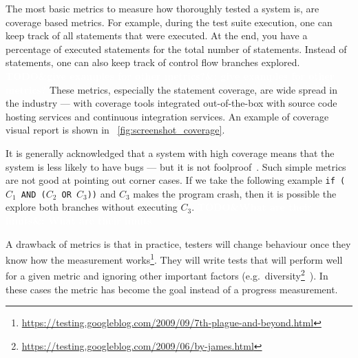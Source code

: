 \documentclass[11pt]{sdm_internship}
\newcommand{\todo}[1]{\colorbox{Red!75}{\textcolor{white}{\textbf{TODO\ifx&#1&\else: #1\fi}}}}
\theoremstyle{definition}
\begin{document}
The most basic metrics to measure how thoroughly tested a system is, are coverage based metrics.
For example, during the test suite execution, one can keep track of all statements that were executed.
At the end, you have a percentage of executed statements for the total number of statements.
Instead of statements, one can also keep track of control flow branches explored.
\todo{give examples for other metrics?}
These metrics, especially the statement coverage, are wide spread in the industry --- with coverage tools integrated out-of-the-box with source code hosting services and continuous integration services.
An example of coverage visual report is shown in \figurename~\ref{fig:screenshot_coverage}.

It is generally acknowledged that a system with high coverage means that the system is less likely to have bugs --- but it is not foolproof~\cite{hovemeyer2004finding,inozemtseva2014coverage}.
Such simple metrics are not good at pointing out corner cases.
If we take the following example \texttt{if ($C_1$ AND ($C_2$ OR $C_3$))} and $C_3$ makes the program crash, then it is possible the explore both branches without executing $C_3$.
\todo{What are their limits}

A drawback of metrics is that in practice, testers will change behaviour once they know how the measurement works\footnote{\url{https://testing.googleblog.com/2009/09/7th-plague-and-beyond.html}}.
They will write tests that will perform well for a given metric and ignoring other important factors (e.g.\ diversity\footnote{\url{https://testing.googleblog.com/2009/06/by-james.html}}~\cite{baudry2014diversify,baudry2015multiple}).
In these cases the metric has become the goal instead of a progress measurement.

\end{document}
